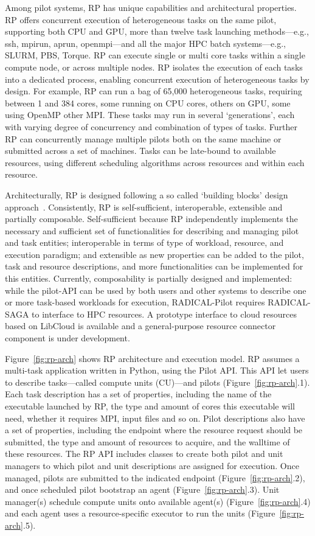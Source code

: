 \documentclass{webofc}
\begin{document}
Among pilot systems, RP has unique capabilities and architectural properties.
RP offers concurrent execution of heterogeneous tasks on the same pilot,
supporting both CPU and GPU, more than twelve task launching methods---e.g.,
ssh, mpirun, aprun, openmpi---and all the major HPC batch systems---e.g.,
SLURM, PBS, Torque. RP can execute single or multi core tasks within a single
compute node, or across multiple nodes. RP isolates the execution of each
tasks into a dedicated process, enabling concurrent execution of
heterogeneous tasks by design. For example, RP can run a bag of 65,000
heterogeneous tasks, requiring between 1 and 384 cores, some running on CPU
cores, others on GPU, some using OpenMP other MPI. These tasks may run in
several ‘generations’, each with varying degree of concurrency and
combination of types of tasks. Further RP can concurrently manage multiple
pilots both on the same machine or submitted across a set of machines. Tasks
can be late-bound to available resources, using different scheduling
algorithms across resources and within each resource.
	
Architecturally, RP is designed following a so called ‘building blocks’
design approach~\cite{turilli2018building}. Consistently, RP is
self-sufficient, interoperable, extensible and partially composable.
Self-sufficient because RP independently implements the necessary and
sufficient set of functionalities for describing and managing pilot and task
entities; interoperable in terms of type of workload, resource, and execution
paradigm; and extensible as new properties can be added to the pilot, task
and resource descriptions, and more functionalities can be implemented for
this entities. Currently, composability is partially designed and
implemented: while the pilot-API can be used by both users and other systems
to describe one or more task-based workloads for execution, RADICAL-Pilot
requires RADICAL-SAGA to interface to HPC resources. A prototype interface to
cloud resources based on LibCloud is available and a general-purpose resource
connector component is under development.	
	
Figure~\ref{fig:rp-arch} shows RP architecture and execution model. RP
assumes a multi-task application written in Python, using the Pilot API. This
API let users to describe tasks---called compute units (CU)---and pilots
(Figure~\ref{fig:rp-arch}.1). Each task description has a set of properties,
including the name of the executable launched by RP, the type and amount of
cores this executable will need, whether it requires MPI, input files and so
on. Pilot descriptions also have a set of properties, including the endpoint
where the resource request should be submitted, the type and amount of
resources to acquire, and the walltime of these resources. The RP API
includes classes to create both pilot and unit managers to which pilot and
unit descriptions are assigned for execution. Once managed, pilots are
submitted to the indicated endpoint (Figure~\ref{fig:rp-arch}.2), and once
scheduled pilot bootstrap an agent (Figure~\ref{fig:rp-arch}.3). Unit
manager(s) schedule compute units onto available agent(s)
(Figure~\ref{fig:rp-arch}.4) and each agent uses a resource-specific executor
to run the units (Figure~\ref{fig:rp-arch}.5).
\end{document}
